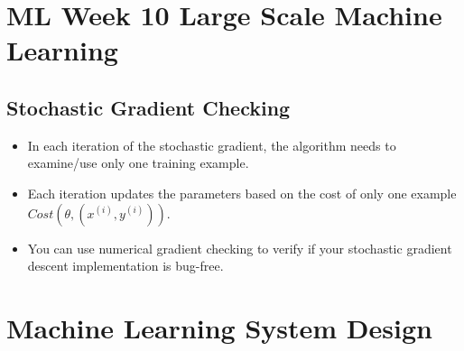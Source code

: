 \documentclass[11pt]{article} %
\begin{document}
\section*{ML Week 10 Large Scale Machine Learning}

\subsection*{Stochastic Gradient Checking}

\begin{itemize}
	\item In each iteration of the stochastic gradient, the algorithm needs to examine/use only one training example.
	\item Each iteration updates the parameters based on the cost of only one example $ Cost (\theta,(x^{(i)},y^{(i)}))$.
	\item You can use numerical gradient checking to verify if your stochastic gradient descent implementation is bug-free.
\end{itemize}
\section*{Machine Learning System Design}
\end{document}
